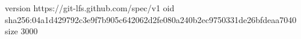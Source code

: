 version https://git-lfs.github.com/spec/v1
oid sha256:04a1d429792c3e9f7b905c642062d2fe080a240b2ec9750331de26bfdeaa7040
size 3000
